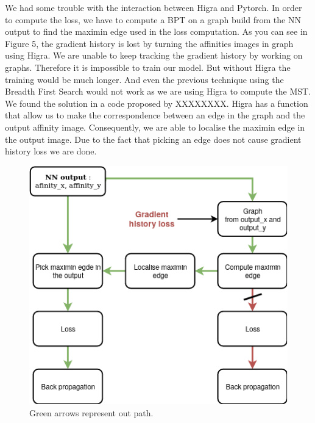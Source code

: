 We had some trouble with the interaction between Higra and Pytorch. In order to compute the loss, we have to compute a BPT on a graph build from the NN output to find the maximin edge used in the loss computation. As you can see in Figure 5, the gradient history is lost by turning the affinities images in graph using Higra. We are unable to keep tracking the gradient history by working on graphs. Therefore it is impossible to train our model. But without Higra the training would be much longer. And even the previous technique using the Breadth First Search would not work as we are using Higra to compute the MST.
We found the solution in a code proposed by XXXXXXXX. Higra has a function that allow us to make the correspondence between an edge in the graph and the output affinity image. Consequently, we are able to localise the maximin edge in the output image. Due to the fact that picking an edge does not cause gradient history loss we are done.

\begin{figure}[!htbp]
	\centering
	\includegraphics[width=0.6\linewidth]{./images/gradient_history.png}
	\caption{Green arrows represent out path.}
	\label{fig:bpt_method}
\end{figure}


